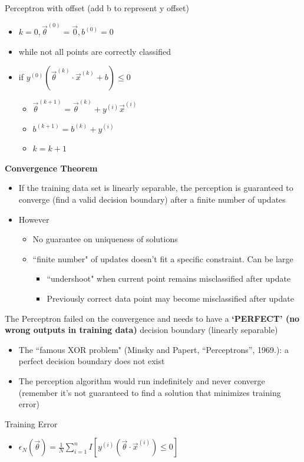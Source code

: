 \documentclass[10pt, oneside]{article}
\begin{document}
Perceptron with offset (add b to represent y offset)
\begin{itemize}
    \item $k=0, \vec \theta^{(0)} = \vec 0, b^{(0)} = 0$
    \item while not all points are correctly classified
    \item if $y^{(0)} (\vec \theta ^{(k)} \cdot \vec x^{(k)} + b)\leq0$
    \begin{itemize}
        \item $\vec \theta^{(k+1)} = \vec \theta^{(k)} + y^{(i)} \vec x^{(i)}$
        \item $b^{(k+1)}= b^{(k)} + y^{(i)}$
        \item $k = k+1$
    \end{itemize}
\end{itemize}
\textbf{Convergence Theorem}
\begin{itemize}
    \item If the training data set is linearly separable, the perception is guaranteed to converge (find a valid decision boundary) after a finite number of updates
    \item However
    \begin{itemize}
        \item No guarantee on uniqueness of solutions
        \item ``finite number" of updates doesn't fit a specific constraint. Can be large
        \begin{itemize}
            \item ``undershoot" when current point remains misclassified after update
            \item Previously correct data point may become misclassified after update
        \end{itemize}
    \end{itemize}
\end{itemize}
The Perceptron failed on the convergence and needs to have a \textbf{`PERFECT'
(no wrong outputs in training data)} decision boundary (linearly separable)
\begin{itemize}
    \item The ``famous XOR problem" (Minsky and Papert, “Perceptrons”, 1969.): a perfect decision boundary does not exist
    \item The perception algorithm would run indefinitely and never converge (remember it's not guaranteed to find a solution that minimizes training error)
\end{itemize}
Training Error
\begin{itemize}
    \item $\epsilon_N(\vec \theta) = \frac{1}{N} \sum_{i=1} ^n I[y^{(i)} (\vec \theta \cdot \vec x ^{(i)}) \leq 0]$
\end{itemize}
\end{document}
